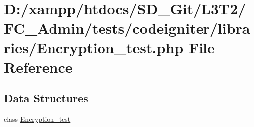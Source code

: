 \hypertarget{_encryption__test_8php}{}\section{D\+:/xampp/htdocs/\+S\+D\+\_\+\+Git/\+L3\+T2/\+F\+C\+\_\+\+Admin/tests/codeigniter/libraries/\+Encryption\+\_\+test.php File Reference}
\label{_encryption__test_8php}
\subsection*{Data Structures}
\begin{DoxyCompactItemize}
\item 
class \hyperlink{class_encryption__test}{Encryption\+\_\+test}
\end{DoxyCompactItemize}
